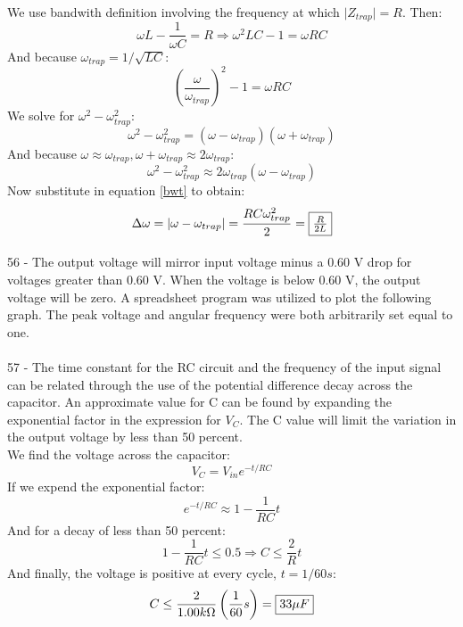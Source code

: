 \documentclass{report}
\begin{document}
We use bandwith definition involving the frequency at which $\lvert Z_{trap} \rvert = R$. Then:
$$\omega L - \frac{1}{\omega C} = R \Rightarrow \omega^2 LC - 1 = \omega RC$$
And because $\omega_{trap} = 1 / \sqrt{LC}$:
$$\left( \frac{\omega}{\omega_{trap}} \right)^2 - 1 = \omega RC$$
We solve for $\omega^2 - \omega_{trap}^2$:
$$\omega^2 - \omega_{trap}^2 = (\omega - \omega_{trap})(\omega + \omega_{trap})$$
And because $\omega \approx \omega_{trap}, \omega + \omega_{trap} \approx 2\omega_{trap}$:
$$\omega^2 - \omega_{trap}^2 \approx 2\omega_{trap}(\omega - \omega_{trap})$$
Now substitute in equation \ref{bwt} to obtain:
$$\Delta \omega = \lvert \omega - \omega_{trap} \rvert = \frac{RC\omega_{trap}^2}{2} = \fbox{$\frac{R}{2L}$}$$

\paragraph{}
56 - The output voltage will mirror input voltage minus a 0.60 V drop for voltages greater than 0.60 V. When the voltage is below 0.60 V, the output voltage will be zero. A spreadsheet program was utilized to plot the following graph. The peak voltage and angular frequency were both arbitrarily set equal to one.\\

\paragraph{}
57 - The time constant for the RC circuit and the frequency of the input signal can be related through the use of the potential difference decay across the capacitor. An approximate value for C can be found by expanding the exponential factor in the expression for $V_C$. The C value will limit the variation in the output voltage by less than 50 percent.\\
We find the voltage across the capacitor:
$$V_C = V_{in} e^{-t / RC}$$
If we expend the exponential factor:
$$e^{-t / RC} \approx 1 - \frac{1}{RC}t$$
And for a decay of less than 50 percent:
$$1 - \frac{1}{RC}t \le 0.5 \Rightarrow C \le \frac{2}{R}t$$
And finally, the voltage is positive at every cycle, $t = 1 / 60 s$:
$$C \le \frac{2}{1.00k\Omega}\left( \frac{1}{60}s \right) = \fbox{$33\mu F$}$$
\end{document}

